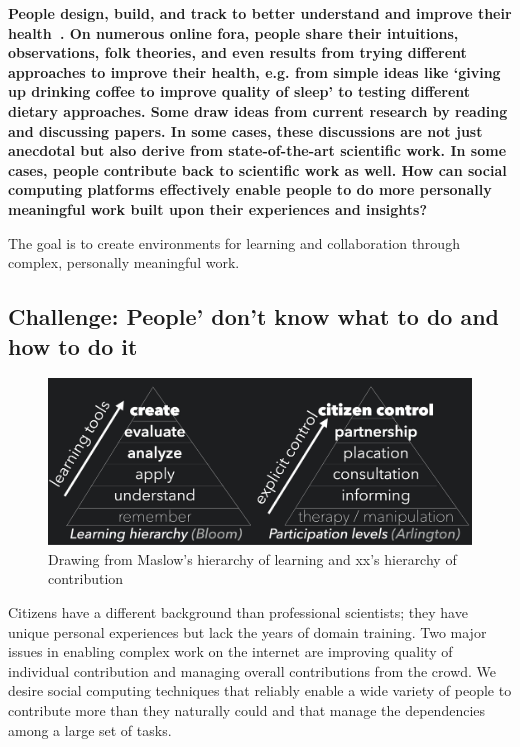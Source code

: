 \textbf{People design, build, and track to better understand and improve their health~\cite{DanaLewis}. On numerous online fora, people share their intuitions, observations, folk theories, and even results from trying different approaches to improve their health, e.g. from simple ideas like ‘giving up drinking coffee to improve quality of sleep’ to testing different dietary approaches. Some draw ideas from current research by reading and discussing papers. In some cases, these discussions are not just anecdotal but also derive from state-of-the-art scientific work. In some cases, people contribute back to scientific work as well. How can social computing platforms effectively enable people to do more personally meaningful work built upon their experiences and insights?}

The goal is to create environments for learning and collaboration through complex, personally meaningful work.

\subsection{Challenge: People' don't know what to do and how to do it}
\begin{figure}[!h] 
  \centering
 \includegraphics[width=1.0\textwidth]{figures/intro/intro-taxonomy}
  \caption[Drawing from Maslow's hierarchy of learning and  hierarchy of contribution]
{Drawing from Maslow's hierarchy of learning and xx's hierarchy of contribution}
  \label{fig:intro-taxonomy}
\end{figure}

Citizens have a different background than professional scientists; they have unique
 personal experiences but lack the years of domain training. Two major issues in 
enabling complex work on the internet are improving quality of individual contribution and 
managing overall contributions from the crowd. We desire social computing techniques
 that reliably enable a wide variety of people to contribute more than they naturally could 
and that manage the dependencies among a large set of tasks. 


